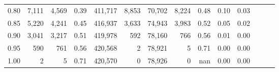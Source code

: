 \begin{tabular}{rrrrrrrrrrrrrr}
0.80 &   7,111 &  4,569 &  0.39 &  411,717 &    8,853 &  70,702 &   8,224 &  0.48 &  0.10 &      0.03 \\
0.85 &   5,220 &  4,241 &  0.45 &  416,937 &    3,633 &  74,943 &   3,983 &  0.52 &  0.05 &      0.02 \\
0.90 &   3,041 &  3,217 &  0.51 &  419,978 &      592 &  78,160 &     766 &  0.56 &  0.01 &      0.00 \\
0.95 &     590 &    761 &  0.56 &  420,568 &        2 &  78,921 &       5 &  0.71 &  0.00 &      0.00 \\
1.00 &       2 &      5 &  0.71 &  420,570 &        0 &  78,926 &       0 &   nan &  0.00 &      0.00 \\
\bottomrule
\end{tabular}
